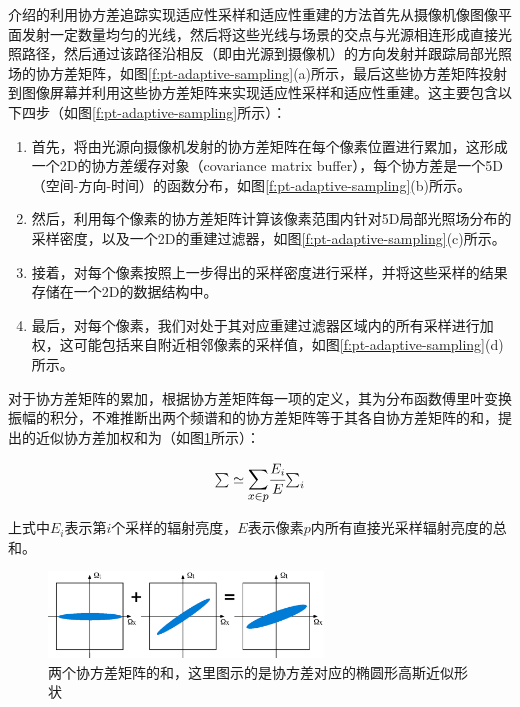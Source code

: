 \cite{a:5DCovarianceTracingforEfficientDefocusandMotionBlur}介绍的利用协方差追踪实现适应性采样和适应性重建的方法首先从摄像机像图像平面发射一定数量均匀的光线，然后将这些光线与场景的交点与光源相连形成直接光照路径，然后通过该路径沿相反（即由光源到摄像机）的方向发射并跟踪局部光照场的协方差矩阵，如图\ref{f:pt-adaptive-sampling}(a)所示，最后这些协方差矩阵投射到图像屏幕并利用这些协方差矩阵来实现适应性采样和适应性重建。这主要包含以下四步（如图\ref{f:pt-adaptive-sampling}所示）：

\begin{enumerate}
	\item 首先，将由光源向摄像机发射的协方差矩阵在每个像素位置进行累加，这形成一个2D的协方差缓存对象（covariance matrix buffer），每个协方差是一个5D（空间-方向-时间）的函数分布，如图\ref{f:pt-adaptive-sampling}(b)所示。
	\item 然后，利用每个像素的协方差矩阵计算该像素范围内针对5D局部光照场分布的采样密度，以及一个2D的重建过滤器，如图\ref{f:pt-adaptive-sampling}(c)所示。
	\item 接着，对每个像素按照上一步得出的采样密度进行采样，并将这些采样的结果存储在一个2D的数据结构中。
	\item 最后，对每个像素，我们对处于其对应重建过滤器区域内的所有采样进行加权，这可能包括来自附近相邻像素的采样值，如图\ref{f:pt-adaptive-sampling}(d)所示。
\end{enumerate}

对于协方差矩阵的累加，根据协方差矩阵每一项的定义，其为分布函数傅里叶变换振幅的积分，不难推断出两个频谱和的协方差矩阵等于其各自协方差矩阵的和，\cite{a:5DCovarianceTracingforEfficientDefocusandMotionBlur}提出的近似协方差加权和为（如图\ref{f:pt-covariance-sum}所示）：

\begin{equation}
 \mathsmaller{\sum}\simeq\mathlarger{\sum_{x\in p}} \cfrac{E_i}{E} \mathsmaller{\sum\nolimits_i}
\end{equation}

\noindent 上式中$E_i$表示第$i$个采样的辐射亮度，$E$表示像素$p$内所有直接光采样辐射亮度的总和。

\begin{figure}
\sidecaption
	\includegraphics[width=0.65\textwidth]{figures/pt/covariance-sum}
	\caption{两个协方差矩阵的和，这里图示的是协方差对应的椭圆形高斯近似形状}
	\label{f:pt-covariance-sum}
\end{figure}

